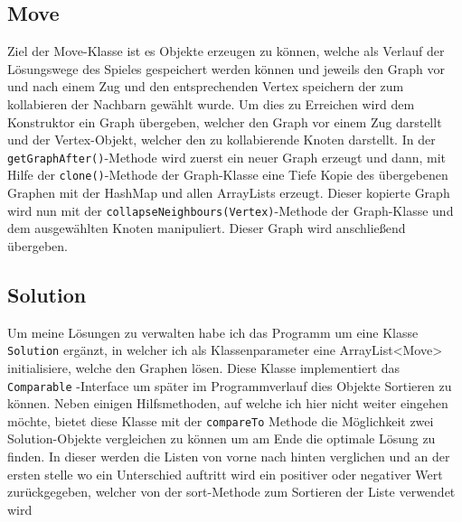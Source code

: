\documentclass[12pt,a4paper]{article}
\begin{document}
\subsection{Move}
Ziel der Move-Klasse ist es Objekte erzeugen zu können, welche als \glqq Verlauf\grqq{} der Lösungswege des Spieles gespeichert werden können und jeweils den Graph vor und nach einem \glqq Zug\grqq{} und den entsprechenden Vertex speichern der zum kollabieren der Nachbarn gewählt wurde. Um dies zu Erreichen wird dem Konstruktor ein Graph übergeben, welcher den Graph vor einem Zug darstellt und der Vertex-Objekt, welcher den zu kollabierende Knoten darstellt. In der \texttt{getGraphAfter()}-Methode wird zuerst ein neuer Graph erzeugt und dann, mit Hilfe der \texttt{clone()}-Methode der Graph-Klasse eine Tiefe Kopie des übergebenen Graphen mit der HashMap und allen ArrayLists erzeugt. Dieser kopierte Graph wird nun mit der \texttt{collapseNeighbours(Vertex)}-Methode der Graph-Klasse und dem ausgewählten Knoten manipuliert. Dieser Graph wird anschließend übergeben.

\subsection{Solution}
Um meine Lösungen zu verwalten habe ich das Programm um eine Klasse \texttt{Solution} ergänzt, in welcher ich als Klassenparameter eine ArrayList<Move> initialisiere, welche den Graphen lösen. Diese Klasse implementiert das\\ \texttt{Comparable} -Interface um später im Programmverlauf dies Objekte Sortieren zu können. Neben einigen Hilfsmethoden, auf welche ich hier nicht weiter eingehen möchte, bietet diese Klasse mit der \texttt{compareTo} Methode die Möglichkeit zwei Solution-Objekte vergleichen zu können um am Ende die optimale Lösung zu finden. In dieser werden die Listen von vorne nach hinten verglichen und an der ersten stelle wo ein Unterschied auftritt wird ein positiver oder negativer Wert zurückgegeben, welcher von der sort-Methode zum Sortieren der Liste verwendet wird
\end{document}
